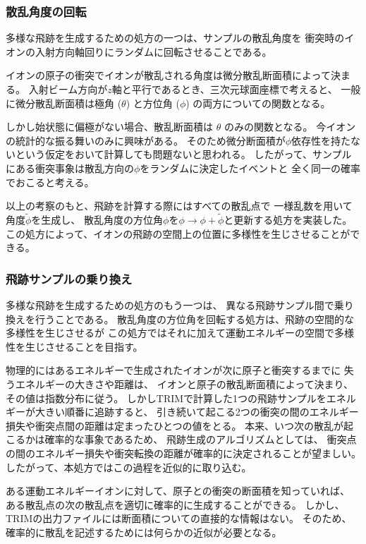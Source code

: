\documentclass [11pt,a4paper,dvipdfmx] {jarticle}
\begin{document}
\subsubsection{散乱角度の回転}
多様な飛跡を生成するための処方の一つは、サンプルの散乱角度を
衝突時のイオンの入射方向軸回りにランダムに回転させることである。

イオンの原子の衝突でイオンが散乱される角度は微分散乱断面積によって決まる。
入射ビーム方向が$z$軸と平行であるとき、三次元球面座標で考えると、
一般に微分散乱断面積は極角 ($\theta$) と方位角 ($\phi$) の両方についての関数となる。

しかし始状態に偏極がない場合、散乱断面積は $\theta$ のみの関数となる。
今イオンの統計的な振る舞いのみに興味がある。
そのため微分断面積が$\phi$依存性を持たないという仮定をおいて計算しても問題ないと思われる。
したがって、サンプルにある衝突事象は散乱方向の$\phi$をランダムに決定したイベントと
全く同一の確率でおこると考える。

以上の考察のもと、飛跡を計算する際にはすべての散乱点で
一様乱数を用いて角度$\tilde{\phi}$を生成し、
散乱角度の方位角$\phi$を$\phi \rightarrow \phi + \tilde{\phi}$と更新する処方を実装した。
この処方によって、イオンの飛跡の空間上の位置に多様性を生じさせることができる。

\subsubsection{飛跡サンプルの乗り換え}
多様な飛跡を生成するための処方のもう一つは、
異なる飛跡サンプル間で乗り換えを行うことである。
散乱角度の方位角を回転する処方は、飛跡の空間的な多様性を生じさせるが
この処方ではそれに加えて運動エネルギーの空間で多様性を生じさせることを目指す。

物理的にはあるエネルギーで生成されたイオンが次に原子と衝突するまでに
失うエネルギーの大きさや距離は、
イオンと原子の散乱断面積によって決まり、その値は指数分布に従う。
しかしTRIMで計算した1つの飛跡サンプルをエネルギーが大きい順番に追跡すると、
引き続いて起こる2つの衝突の間のエネルギー損失や衝突点間の距離は定まったひとつの値をとる。
本来、いつ次の散乱が起こるかは確率的な事象であるため、
飛跡生成のアルゴリズムとしては、
衝突点の間のエネルギー損失や衝突転換の距離が確率的に決定されることが望ましい。
したがって、本処方ではこの過程を近似的に取り込む。

ある運動エネルギーイオンに対して、原子との衝突の断面積を知っていれば、
ある散乱点の次の散乱点を適切に確率的に生成することができる。
しかし、TRIMの出力ファイルには断面積についての直接的な情報はない。
そのため、確率的に散乱を記述するためには何らかの近似が必要となる。
\end{document}
